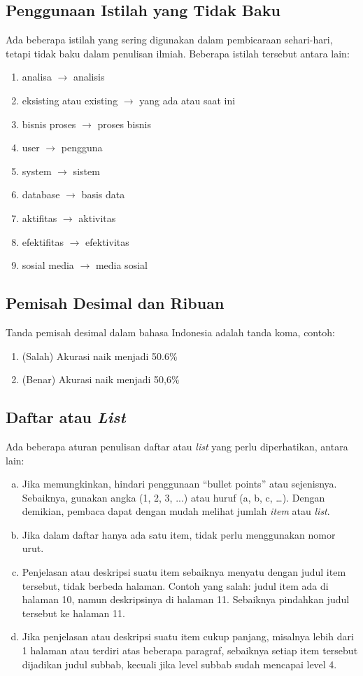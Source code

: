 \documentclass[12pt,a4paper,oneside]{book}
\begin{document}
\subsection{Penggunaan Istilah yang Tidak Baku}
Ada beberapa istilah yang sering digunakan dalam pembicaraan sehari-hari, tetapi tidak baku dalam penulisan ilmiah.
Beberapa istilah tersebut antara lain:
\begin{enumerate}
  \item analisa $\rightarrow$ analisis
  \item eksisting atau existing $\rightarrow$ yang ada atau saat ini
  \item bisnis proses $\rightarrow$ proses bisnis
  \item user $\rightarrow$ pengguna
  \item system $\rightarrow$ sistem
  \item database $\rightarrow$ basis data
  \item aktifitas $\rightarrow$ aktivitas
  \item efektifitas $\rightarrow$ efektivitas
  \item sosial media $\rightarrow$ media sosial
\end{enumerate}

\subsection{Pemisah Desimal dan Ribuan}
Tanda pemisah desimal dalam bahasa Indonesia adalah tanda koma, contoh:
\begin{enumerate}
  \item (Salah) Akurasi naik menjadi 50.6\% 
  \item (Benar) Akurasi naik menjadi 50,6\% 
\end{enumerate}

\subsection{Daftar atau \textit{List}}
Ada beberapa aturan penulisan daftar atau \textit{list} yang perlu diperhatikan, antara lain:
\begin{enumerate}[a)]
\item Jika memungkinkan, hindari penggunaan “bullet points” atau sejenisnya. Sebaiknya, gunakan angka (1, 2, 3, ...) atau huruf (a, b, c, …). Dengan demikian, pembaca dapat dengan mudah melihat jumlah \textit{item} atau \textit{list}. 
\item Jika dalam daftar hanya ada satu item, tidak perlu menggunakan nomor urut.
\item Penjelasan atau deskripsi suatu item sebaiknya menyatu dengan judul item tersebut, tidak berbeda halaman. Contoh yang salah: judul item ada di halaman 10, namun deskripsinya di halaman 11. Sebaiknya pindahkan judul tersebut ke halaman 11.
\item Jika penjelasan atau deskripsi suatu item cukup panjang, misalnya lebih dari 1 halaman atau terdiri atas beberapa paragraf, sebaiknya setiap item tersebut dijadikan judul subbab, kecuali jika level subbab sudah mencapai level 4. 
\end{enumerate}
\end{document}
